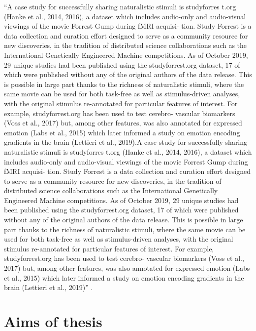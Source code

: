 ``A case study for successfully sharing naturalistic stimuli is studyforres t.org
(Hanke et al., 2014, 2016), a dataset which includes audio-only and audio-visual
viewings of the movie Forrest Gump during fMRI acquisi- tion. Study Forrest is a
data collection and curation effort designed to serve as a community resource
for new discoveries, in the tradition of distributed science collaborations such
as the International Genetically Engineered Machine competitions. As of October
2019, 29 unique studies had been published using the studyforrest.org dataset,
17 of which were published without any of the original authors of the data
release. This is possible in large part thanks to the richness of naturalistic
stimuli, where the same movie can be used for both task-free as well as
stimulus-driven analyses, with the original stimulus re-annotated for particular
features of interest. For example, studyforrest.org has been used to test
cerebro- vascular biomarkers (Voss et al., 2017) but, among other features, was
also annotated for expressed emotion (Labs et al., 2015) which later informed a
study on emotion encoding gradients in the brain (Lettieri et al., 2019).A case
study for successfully sharing naturalistic stimuli is studyforres t.org (Hanke
et al., 2014, 2016), a dataset which includes audio-only and audio-visual
viewings of the movie Forrest Gump during fMRI acquisi- tion. Study Forrest is a
data collection and curation effort designed to serve as a community resource
for new discoveries, in the tradition of distributed science collaborations such
as the International Genetically Engineered Machine competitions. As of October
2019, 29 unique studies had been published using the studyforrest.org dataset,
17 of which were published without any of the original authors of the data
release. This is possible in large part thanks to the richness of naturalistic
stimuli, where the same movie can be used for both task-free as well as
stimulus-driven analyses, with the original stimulus re-annotated for particular
features of interest. For example, studyforrest.org has been used to test
cerebro- vascular biomarkers (Voss et al., 2017) but, among other features, was
also annotated for expressed emotion (Labs et al., 2015) which later informed a
study on emotion encoding gradients in the brain (Lettieri et al., 2019)''
\citep{dupre2020nature}.


\section{Aims of thesis}


